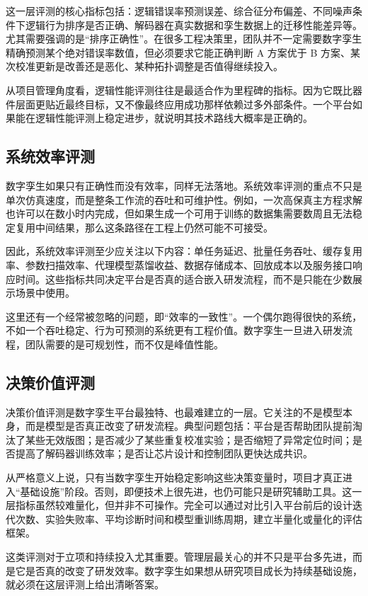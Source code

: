 \documentclass[11pt,a4paper]{article}
\begin{document}
这一层评测的核心指标包括：逻辑错误率预测误差、综合征分布偏差、不同噪声条件下逻辑行为排序是否正确、解码器在真实数据和孪生数据上的迁移性能差异等。尤其需要强调的是“排序正确性”。在很多工程决策里，团队并不一定需要数字孪生精确预测某个绝对错误率数值，但必须要求它能正确判断 A 方案优于 B 方案、某次校准更新是改善还是恶化、某种拓扑调整是否值得继续投入。

从项目管理角度看，逻辑性能评测往往是最适合作为里程碑的指标。因为它既比器件层面更贴近最终目标，又不像最终应用成功那样依赖过多外部条件。一个平台如果能在逻辑性能评测上稳定进步，就说明其技术路线大概率是正确的。

\subsection{系统效率评测}

数字孪生如果只有正确性而没有效率，同样无法落地。系统效率评测的重点不只是单次仿真速度，而是整条工作流的吞吐和可维护性。例如，一次高保真主方程求解也许可以在数小时内完成，但如果生成一个可用于训练的数据集需要数周且无法稳定复用中间结果，那么这条路径在工程上仍然可能不可接受。

因此，系统效率评测至少应关注以下内容：单任务延迟、批量任务吞吐、缓存复用率、参数扫描效率、代理模型蒸馏收益、数据存储成本、回放成本以及服务接口响应时间。这些指标共同决定平台是否真的适合嵌入研发流程，而不是只能在少数展示场景中使用。

这里还有一个经常被忽略的问题，即“效率的一致性”。一个偶尔跑得很快的系统，不如一个吞吐稳定、行为可预测的系统更有工程价值。数字孪生一旦进入研发流程，团队需要的是可规划性，而不仅是峰值性能。

\subsection{决策价值评测}

决策价值评测是数字孪生平台最独特、也最难建立的一层。它关注的不是模型本身，而是模型是否真正改变了研发流程。典型问题包括：平台是否帮助团队提前淘汰了某些无效版图；是否减少了某些重复校准实验；是否缩短了异常定位时间；是否提高了解码器训练效率；是否让芯片设计和控制团队更快达成共识。

从严格意义上说，只有当数字孪生开始稳定影响这些决策变量时，项目才真正进入“基础设施”阶段。否则，即便技术上很先进，也仍可能只是研究辅助工具。这一层指标虽然较难量化，但并非不可操作。完全可以通过对比引入平台前后的设计迭代次数、实验失败率、平均诊断时间和模型重训练周期，建立半量化或量化的评估框架。

这类评测对于立项和持续投入尤其重要。管理层最关心的并不只是平台多先进，而是它是否真的改变了研发效率。数字孪生如果想从研究项目成长为持续基础设施，就必须在这层评测上给出清晰答案。
\end{document}
